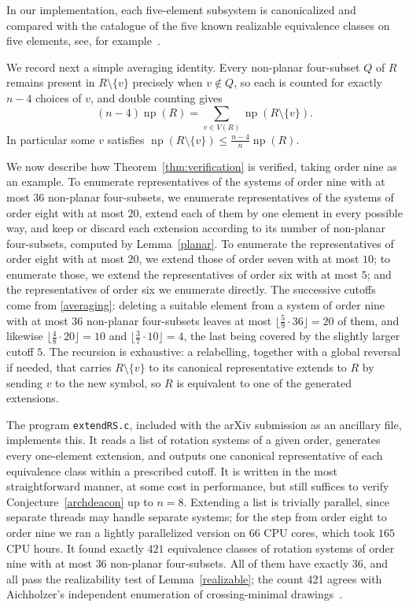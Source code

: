 \documentclass{article}
\theoremstyle{plain}
\theoremstyle{definition}
\theoremstyle{remark}
\newcommand{\np}{\operatorname{np}}
\begin{document}
In our implementation, each five-element subsystem is canonicalized
and compared with the catalogue of the five known realizable equivalence
classes on five elements, see, for example~\cite{AbregoEtAl2015}.

We record next a simple averaging identity.  Every non-planar
four-subset \(Q\) of \(R\) remains present in \(R\setminus\{v\}\)
precisely when \(v\notin Q\), so each is counted for exactly \(n-4\)
choices of \(v\), and double counting gives
\begin{equation}\label{averaging}
(n-4)\np(R)=\sum_{v\in V(R)}\np(R\setminus\{v\}).
\end{equation}
In particular some \(v\) satisfies
\(\np(R\setminus\{v\})\leq\frac{n-4}{n}\np(R)\).

We now describe how Theorem~\ref{thm:verification} is verified, taking
order nine as an example.  To enumerate representatives of the
systems of order nine with at most \(36\) non-planar four-subsets, we
enumerate representatives of the systems of order eight with at most
\(20\), extend each of them by one element in every possible way, and
keep or discard each extension according to its number of
non-planar four-subsets, computed by Lemma~\ref{planar}.  To enumerate the
representatives of order eight with at most \(20\), we extend those of
order seven with at most \(10\); to enumerate those, we extend the
representatives of order six with at most \(5\); and the
representatives of order six we enumerate directly.  The successive
cutoffs come from \eqref{averaging}: deleting a suitable element from
a system of order nine with at most \(36\) non-planar four-subsets
leaves at most \(\lfloor\frac59\cdot 36\rfloor=20\) of them, and
likewise \(\lfloor\frac48\cdot 20\rfloor=10\) and
\(\lfloor\frac37\cdot 10\rfloor=4\), the last being covered by the
slightly larger cutoff \(5\).  The recursion is exhaustive: a relabelling,
together with a global reversal if needed, that carries
\(R\setminus\{v\}\) to its canonical representative extends to \(R\)
by sending \(v\) to the new symbol, so \(R\) is equivalent to one of
the generated extensions.

The program {\tt extendRS.c}, included with the arXiv submission as an
ancillary file, implements this.  It reads a list of rotation systems
of a given order, generates every one-element extension, and outputs
one canonical representative of each equivalence class within a
prescribed cutoff.  It is written in the most straightforward manner,
at some cost in performance, but still suffices to verify
Conjecture~\ref{archdeacon} up to \(n=8\).  Extending a list is
trivially parallel, since separate threads may handle separate
systems; for the step from order eight to order nine we ran a lightly
parallelized version on \(66\) CPU cores, which took \(165\) CPU
hours.  It found exactly \(421\) equivalence classes of rotation
systems of order nine with at most \(36\) non-planar four-subsets.
All of them have exactly \(36\), and all pass the realizability test
of Lemma~\ref{realizable}; the count 421 agrees with Aichholzer's
independent enumeration of crossing-minimal
drawings~\cite{Aichholzer2021}.
\end{document}
